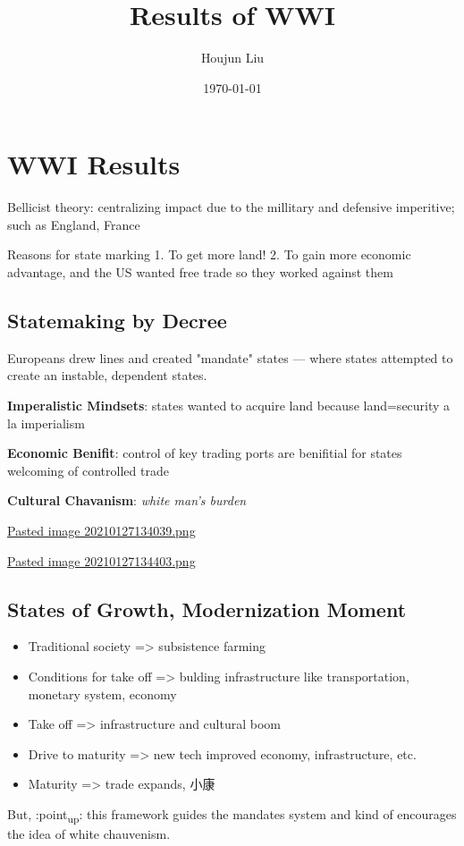\documentclass[letterpaper]{article}
\author{Houjun Liu}
\date{\today}
\title{Results of WWI}
\renewcommand{\tableofcontents}{}
\begin{document}
\tableofcontents



\section{WWI Results}
\label{sec:orgf7bd5df}
Bellicist theory: centralizing impact due to the millitary and defensive
imperitive; such as England, France

Reasons for state marking 1. To get more land! 2. To gain more economic
advantage, and the US wanted free trade so they worked against them

\subsection{Statemaking by Decree}
\label{sec:org11d7f4d}
Europeans drew lines and created "mandate" states --- where states
attempted to create an instable, dependent states.

\textbf{Imperalistic Mindsets}: states wanted to acquire land because
land=security a la imperialism

\textbf{Economic Benifit}: control of key trading ports are benifitial for
states welcoming of controlled trade

\textbf{Cultural Chavanism}: \emph{white man's burden}

\href{Pasted image 20210127134039.png.org}{Pasted image
20210127134039.png}

\href{Pasted image 20210127134403.png.org}{Pasted image
20210127134403.png}

\subsection{States of Growth, Modernization Moment}
\label{sec:org0b61fdd}
\begin{itemize}
\item Traditional society => subsistence farming
\item Conditions for take off => bulding infrastructure like transportation,
monetary system, economy
\item Take off => infrastructure and cultural boom
\item Drive to maturity => new tech improved economy, infrastructure, etc.
\item Maturity => trade expands, 小康
\end{itemize}

But, :point\textsubscript{up}: this framework guides the mandates system and kind of
encourages the idea of white chauvenism.
\end{document}
